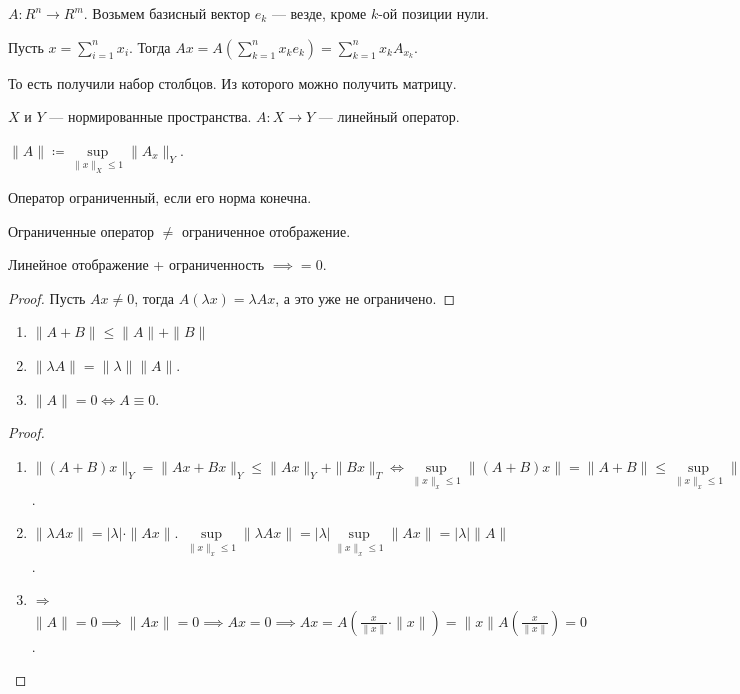 \begin{definition}
    $A\!: R^n \to R^m$. Возьмем базисный вектор  $e_k$ --- везде, кроме  $k$-ой позиции нули.

    Пусть  $x = \sum\limits_{i=1}^n x_i$. Тогда  $Ax = A(\sum\limits_{k=1}^n x_k e_k) = \sum\limits_{k=1}^n x_k A_{x_k}$. 

    То есть получили набор столбцов. Из которого можно получить матрицу. 
\end{definition}
\begin{definition}
    $X$ и  $Y$ --- нормированные пространства.  $A\!: X \to Y$ --- линейный оператор.

     $\| A \| \coloneqq \sup\limits_{\|x\|_X \le 1} \|A_x \|_Y$.

     Оператор ограниченный, если его норма конечна.
\end{definition}
\begin{remark}
    Ограниченные оператор $\neq$ ограниченное отображение. 

    Линейное отображение + ограниченность  $\implies = 0$.

\end{remark}
\begin{proof}
    Пусть $Ax \neq 0$, тогда  $A(\lambda x) = \lambda Ax$, а это уже не ограничено.
\end{proof}
\begin{properties}
    \begin{enumerate}
        \item $\| A + B \| \le \| A \| + \| B \|$
        \item $\| \lambda A \| = \|\lambda\| \|A \|$.
        \item  $\|A\| = 0 \iff A \equiv 0$.
    \end{enumerate}
\end{properties}
\begin{proof}
    \begin{enumerate}
        \item $\|(A+B)x\|_Y = \|Ax + Bx\|_Y \le \|Ax\|_Y + \|Bx\|_T \iff \sup\limits_{\| x\|_x \le 1} \|(A+B)x\| = \|A+B\| \le \sup\limits_{\| x\|_x \le 1} \|Ax\|_Y + \sup\limits_{\| x\|_x \le 1} \|Bx\|_Y$.
        \item $\| \lambda Ax \| = |\lambda| \cdot \|Ax \|$.  $\sup\limits_{\| x\|_x \le 1} \|\lambda A x \| = |\lambda| \sup\limits_{\| x\|_x \le 1} \| Ax\| = |\lambda| \| A\|$.
        \item $\Rightarrow$  $\|A\| = 0 \implies \|Ax\| = 0 \implies Ax = 0 \implies Ax = A(\frac{x}{\| x\|} \cdot \|x \|) = \|x\| A(\frac{x}{\|x\|}) = 0$.
    \end{enumerate}
\end{proof}
